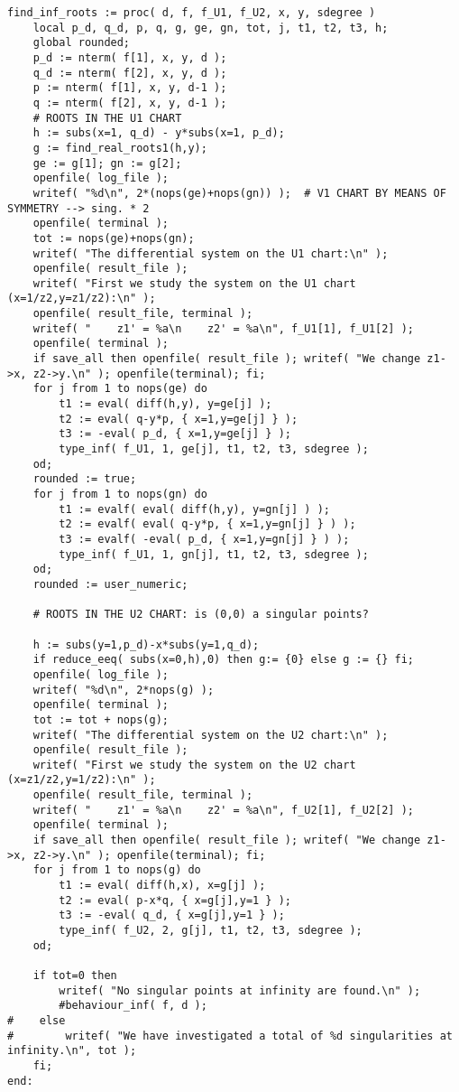 \documentclass[a4paper,10pt]{article}
\begin{document}
\begin{lstlisting}[name=infinity]
find_inf_roots := proc( d, f, f_U1, f_U2, x, y, sdegree )
    local p_d, q_d, p, q, g, ge, gn, tot, j, t1, t2, t3, h;
    global rounded;
    p_d := nterm( f[1], x, y, d );
    q_d := nterm( f[2], x, y, d );
    p := nterm( f[1], x, y, d-1 );
    q := nterm( f[2], x, y, d-1 );
    # ROOTS IN THE U1 CHART
    h := subs(x=1, q_d) - y*subs(x=1, p_d);
    g := find_real_roots1(h,y);
    ge := g[1]; gn := g[2];
    openfile( log_file );
    writef( "%d\n", 2*(nops(ge)+nops(gn)) );  # V1 CHART BY MEANS OF SYMMETRY --> sing. * 2
    openfile( terminal );
    tot := nops(ge)+nops(gn);
    writef( "The differential system on the U1 chart:\n" );
    openfile( result_file );
    writef( "First we study the system on the U1 chart (x=1/z2,y=z1/z2):\n" );
    openfile( result_file, terminal );
    writef( "    z1' = %a\n    z2' = %a\n", f_U1[1], f_U1[2] );
    openfile( terminal );
    if save_all then openfile( result_file ); writef( "We change z1->x, z2->y.\n" ); openfile(terminal); fi;
    for j from 1 to nops(ge) do
        t1 := eval( diff(h,y), y=ge[j] );
        t2 := eval( q-y*p, { x=1,y=ge[j] } );
        t3 := -eval( p_d, { x=1,y=ge[j] } );
        type_inf( f_U1, 1, ge[j], t1, t2, t3, sdegree );
    od;
    rounded := true;
    for j from 1 to nops(gn) do
        t1 := evalf( eval( diff(h,y), y=gn[j] ) );
        t2 := evalf( eval( q-y*p, { x=1,y=gn[j] } ) );
        t3 := evalf( -eval( p_d, { x=1,y=gn[j] } ) );
        type_inf( f_U1, 1, gn[j], t1, t2, t3, sdegree );
    od;
    rounded := user_numeric;

    # ROOTS IN THE U2 CHART: is (0,0) a singular points?

    h := subs(y=1,p_d)-x*subs(y=1,q_d);
    if reduce_eeq( subs(x=0,h),0) then g:= {0} else g := {} fi;
    openfile( log_file );
    writef( "%d\n", 2*nops(g) );
    openfile( terminal );
    tot := tot + nops(g);
    writef( "The differential system on the U2 chart:\n" );
    openfile( result_file );
    writef( "First we study the system on the U2 chart (x=z1/z2,y=1/z2):\n" );
    openfile( result_file, terminal );
    writef( "    z1' = %a\n    z2' = %a\n", f_U2[1], f_U2[2] );
    openfile( terminal );
    if save_all then openfile( result_file ); writef( "We change z1->x, z2->y.\n" ); openfile(terminal); fi;
    for j from 1 to nops(g) do
        t1 := eval( diff(h,x), x=g[j] );
        t2 := eval( p-x*q, { x=g[j],y=1 } );
        t3 := -eval( q_d, { x=g[j],y=1 } );
        type_inf( f_U2, 2, g[j], t1, t2, t3, sdegree );
    od;

    if tot=0 then
        writef( "No singular points at infinity are found.\n" );
        #behaviour_inf( f, d );
#    else
#        writef( "We have investigated a total of %d singularities at infinity.\n", tot );
    fi;
end:
\end{lstlisting}
\end{document}
